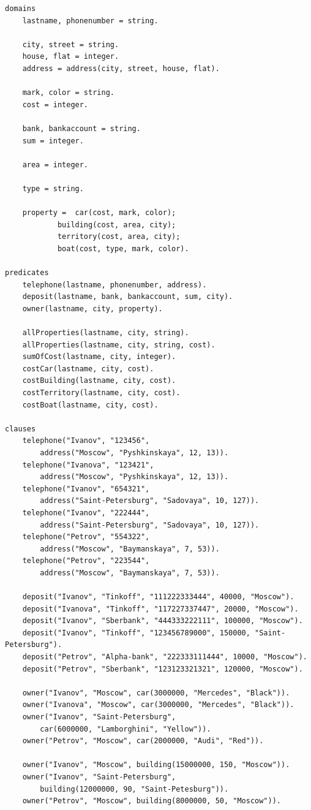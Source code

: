 \begin{lstlisting}[caption=Текст программы]
domains
	lastname, phonenumber = string.

	city, street = string.
	house, flat = integer.
	address = address(city, street, house, flat).

	mark, color = string.
	cost = integer.

	bank, bankaccount = string.
	sum = integer.

	area = integer.

	type = string.

	property = 	car(cost, mark, color);
			building(cost, area, city);
			territory(cost, area, city);
			boat(cost, type, mark, color).

predicates
	telephone(lastname, phonenumber, address).
	deposit(lastname, bank, bankaccount, sum, city).
	owner(lastname, city, property).

	allProperties(lastname, city, string).
	allProperties(lastname, city, string, cost).
	sumOfCost(lastname, city, integer).
	costCar(lastname, city, cost).
	costBuilding(lastname, city, cost).
	costTerritory(lastname, city, cost).
	costBoat(lastname, city, cost).

clauses
	telephone("Ivanov", "123456",
		address("Moscow", "Pyshkinskaya", 12, 13)).
	telephone("Ivanova", "123421",
		address("Moscow", "Pyshkinskaya", 12, 13)).
	telephone("Ivanov", "654321",
		address("Saint-Petersburg", "Sadovaya", 10, 127)).
	telephone("Ivanov", "222444",
		address("Saint-Petersburg", "Sadovaya", 10, 127)).
	telephone("Petrov", "554322",
		address("Moscow", "Baymanskaya", 7, 53)).
	telephone("Petrov", "223544",
		address("Moscow", "Baymanskaya", 7, 53)).

	deposit("Ivanov", "Tinkoff", "111222333444", 40000, "Moscow").
	deposit("Ivanova", "Tinkoff", "117227337447", 20000, "Moscow").
	deposit("Ivanov", "Sberbank", "444333222111", 100000, "Moscow").
	deposit("Ivanov", "Tinkoff", "123456789000", 150000, "Saint-Petersburg").
	deposit("Petrov", "Alpha-bank", "222333111444", 10000, "Moscow").
	deposit("Petrov", "Sberbank", "123123321321", 120000, "Moscow").

	owner("Ivanov", "Moscow", car(3000000, "Mercedes", "Black")).
	owner("Ivanova", "Moscow", car(3000000, "Mercedes", "Black")).
	owner("Ivanov", "Saint-Petersburg",
		car(6000000, "Lamborghini", "Yellow")).
	owner("Petrov", "Moscow", car(2000000, "Audi", "Red")).

	owner("Ivanov", "Moscow", building(15000000, 150, "Moscow")).
	owner("Ivanov", "Saint-Petersburg",
		building(12000000, 90, "Saint-Petesburg")).
	owner("Petrov", "Moscow", building(8000000, 50, "Moscow")).


\end{lstlisting}
